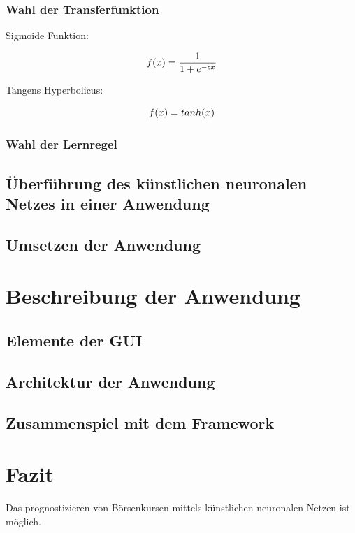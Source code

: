 \documentclass[a4paper,DIV11,bibliography=totoc,headings=normal,ngerman,headsepline]{scrreprt}
\newcommand*{\formelentry}[1]{\addcontentsline{for}{formel}{\protect\numberline{Formel~\theequation} #1}}
\begin{document}
\subsection{Wahl der Transferfunktion} %

Sigmoide Funktion:

\begin{equation}\formelentry{Sigmoide Funktion}
f(x)= \frac{1}{1+e^{-cx}}
\end{equation}

Tangens Hyperbolicus:

\begin{equation}\formelentry{Tanh Funktion}
f(x)= tanh(x)
\end{equation}

\subsection{Wahl der Lernregel} %
\section{Überführung des künstlichen neuronalen Netzes in einer Anwendung}
\section{Umsetzen der Anwendung} %

\chapter{Beschreibung der Anwendung} %
\section{Elemente der GUI} %
\section{Architektur der Anwendung} %
\section{Zusammenspiel mit dem Framework} %

\chapter{Fazit} %
\label{cha:Fazit}
Das prognostizieren von Börsenkursen mittels künstlichen neuronalen Netzen ist möglich.


\end{document}
